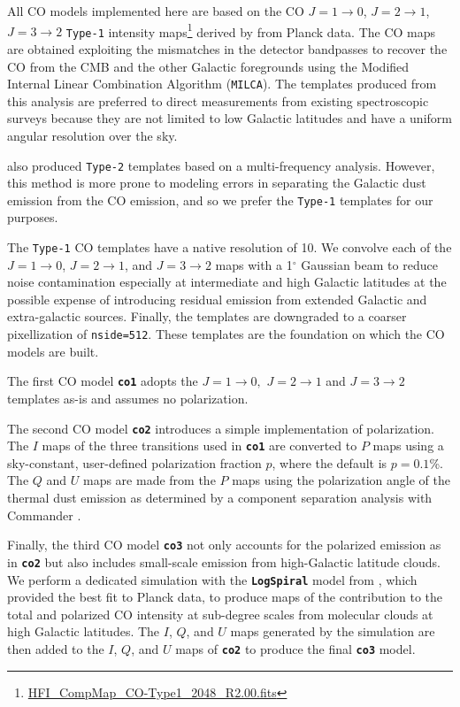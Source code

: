 \documentclass[twocolumn]{aastex631}
\begin{document}
All CO models implemented here are based on the CO $J = 1\rightarrow0$, $J = 2\rightarrow1$, $J = 3\rightarrow2$ \texttt{Type-1} intensity maps\footnote{\url{HFI_CompMap_CO-Type1_2048_R2.00.fits}} derived by \citet{planck2013-p03a} from Planck data. The CO maps are obtained exploiting the mismatches in the detector bandpasses to recover the CO from the CMB and the other Galactic foregrounds using the Modified Internal Linear Combination Algorithm (\texttt{MILCA}). The templates produced from this analysis are preferred to direct measurements from existing spectroscopic surveys \citep[e.g.,][]{Dame:2001} because they are not limited to low Galactic latitudes and have a uniform angular resolution over the sky.

\citet{planck2013-p03a} also produced \texttt{Type-2} templates based on a multi-frequency analysis. However, this method is more prone to modeling errors in separating the Galactic dust emission from the CO emission, and so we prefer the \texttt{Type-1} templates for our purposes.

The \texttt{Type-1} CO templates have a native resolution of 10\arcmin. We convolve each of the $J = 1\rightarrow0$, $J = 2\rightarrow1$, and $J = 3\rightarrow2$ maps with a 1$^\circ$ Gaussian beam to reduce noise contamination especially at intermediate and high Galactic latitudes at the possible expense of introducing residual emission from extended Galactic and extra-galactic sources. Finally, the templates are downgraded to a coarser pixellization of \texttt{nside=512}. These templates are the foundation on which the CO models are built.

The first CO model {\bf\texttt{co1}} adopts the $J = 1\rightarrow0,$  $J = 2\rightarrow1$ and $J = 3\rightarrow2$ templates as-is and assumes no polarization. 

The second CO model {\bf\texttt{co2}} introduces a simple implementation of polarization. The $I$ maps of the three transitions used in  {\bf\texttt{co1}} are converted to $P$ maps using a sky-constant, user-defined polarization fraction $p$, where the default is $p = 0.1$\%. The $Q$ and $U$ maps are made from the $P$ maps using the polarization angle of the thermal dust emission as determined by a component separation analysis with Commander \citep{planck2014-a12}.

Finally, the third CO model {\bf\texttt{co3}} not only accounts for the polarized emission as in {\bf\texttt{co2}} but also includes small-scale emission from high-Galactic latitude clouds. We perform a dedicated simulation with the {\bf\texttt{LogSpiral}} model from \citet{Puglisi:2017}, which provided the best fit to Planck data, to produce maps of the contribution to the total and polarized CO intensity at sub-degree scales from molecular clouds at high Galactic latitudes. The $I$, $Q$, and $U$ maps generated by the simulation are then added to the $I$, $Q$, and $U$ maps of {\bf\texttt{co2}} to produce the final {\bf\texttt{co3}} model.
 
\end{document}
